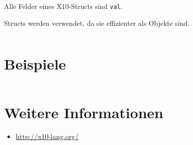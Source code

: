Alle Felder eines X10-Structs sind \texttt{val}.

Structs werden verwendet, da sie effizienter als Objekte sind.

\begin{beispiel}[struct]
    \inputminted[numbersep=5pt, tabsize=4]{scala}{scripts/x10/x10-struct-example.x10}
\end{beispiel}

\section{Beispiele}

\inputminted[linenos, numbersep=5pt, tabsize=4, frame=lines, label=Fibonacci.x10]{scala}{scripts/x10/Fibonacci.x10}

\section{Weitere Informationen}
\begin{itemize}
    \item \url{http://x10-lang.org/}
\end{itemize}
